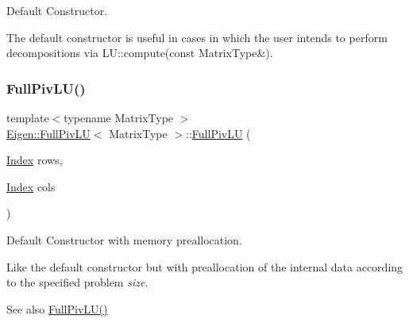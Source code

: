 Default Constructor. 

The default constructor is useful in cases in which the user intends to perform decompositions via L\+U\+::compute(const Matrix\+Type\&). \mbox{\label{class_eigen_1_1_full_piv_l_u_ae83ebd2a24088f04e3ac835b0dc001e1}} 
\subsubsection{\texorpdfstring{FullPivLU()}{FullPivLU()}\hspace{0.1cm}{\footnotesize\ttfamily [2/4]}}
{\footnotesize\ttfamily template$<$typename Matrix\+Type $>$ \\
\mbox{\hyperlink{class_eigen_1_1_full_piv_l_u}{Eigen\+::\+Full\+Piv\+LU}}$<$ Matrix\+Type $>$\+::\mbox{\hyperlink{class_eigen_1_1_full_piv_l_u}{Full\+Piv\+LU}} (\begin{DoxyParamCaption}\item[{\mbox{\hyperlink{struct_eigen_1_1_eigen_base_a554f30542cc2316add4b1ea0a492ff02}{Index}}}]{rows,  }\item[{\mbox{\hyperlink{struct_eigen_1_1_eigen_base_a554f30542cc2316add4b1ea0a492ff02}{Index}}}]{cols }\end{DoxyParamCaption})}



Default Constructor with memory preallocation. 

Like the default constructor but with preallocation of the internal data according to the specified problem {\itshape size}. \begin{DoxySeeAlso}{See also}
\mbox{\hyperlink{class_eigen_1_1_full_piv_l_u_af225528d1c6e623a2b1dce091907d13e}{Full\+Piv\+L\+U()}} 
\end{DoxySeeAlso}
\mbox{\label{class_eigen_1_1_full_piv_l_u_a31a6a984478a9f721f367667fe4c5ab1}} 
